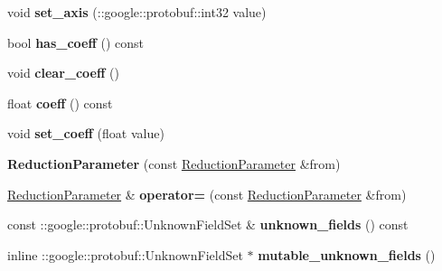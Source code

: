 \begin{DoxyCompactItemize}
void {\bfseries set\+\_\+axis} (\+::google\+::protobuf\+::int32 value)
\item 
\mbox{\label{classcaffe_1_1_reduction_parameter_a812e37d4787ef491d26bd7f9e8d190c0}} 
bool {\bfseries has\+\_\+coeff} () const
\item 
\mbox{\label{classcaffe_1_1_reduction_parameter_a56716bb3d78867ff85d55ce058a5c828}} 
void {\bfseries clear\+\_\+coeff} ()
\item 
\mbox{\label{classcaffe_1_1_reduction_parameter_a7c713521cd164c3bc76e8c48dbe4fa32}} 
float {\bfseries coeff} () const
\item 
\mbox{\label{classcaffe_1_1_reduction_parameter_ae328cdd5c05cfdf3b66a4bddbf402b5a}} 
void {\bfseries set\+\_\+coeff} (float value)
\item 
\mbox{\label{classcaffe_1_1_reduction_parameter_a1038be0f65c73f5675edf97779c86504}} 
{\bfseries Reduction\+Parameter} (const \mbox{\hyperlink{classcaffe_1_1_reduction_parameter}{Reduction\+Parameter}} \&from)
\item 
\mbox{\label{classcaffe_1_1_reduction_parameter_af614a27d62a0cbea5a5805378ccba081}} 
\mbox{\hyperlink{classcaffe_1_1_reduction_parameter}{Reduction\+Parameter}} \& {\bfseries operator=} (const \mbox{\hyperlink{classcaffe_1_1_reduction_parameter}{Reduction\+Parameter}} \&from)
\item 
\mbox{\label{classcaffe_1_1_reduction_parameter_ae1d04473b65b70d3ffc7b831c015ee2e}} 
const \+::google\+::protobuf\+::\+Unknown\+Field\+Set \& {\bfseries unknown\+\_\+fields} () const
\item 
\mbox{\label{classcaffe_1_1_reduction_parameter_a3d0e04400959dfadcc018d9271dca15e}} 
inline \+::google\+::protobuf\+::\+Unknown\+Field\+Set $\ast$ {\bfseries mutable\+\_\+unknown\+\_\+fields} ()
\item 
\mbox{\label{classcaffe_1_1_reduction_parameter_aa7f57fa9194f25a16f4feab76f9224ac}} 

\end{DoxyCompactItemize}
